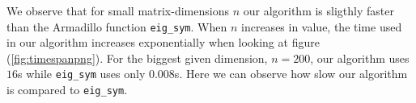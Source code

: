 \documentclass{article}
\begin{document}
\begin{multicols}{2}
  We observe that for small matrix-dimensions $n$ our algorithm is sligthly faster than the Armadillo function \texttt{eig\_sym}. When $n$ increases in value, the time used in our algorithm increases exponentially when looking at figure (\ref{fig:timespanpng}). For the biggest given dimension, $n = 200$, our algorithm uses $16$s  while \texttt{eig\_sym} uses only $0.008$s. Here we can observe how slow our algorithm is compared to \texttt{eig\_sym}. \\

\end{multicols}
\end{document}
